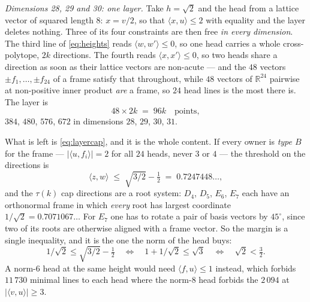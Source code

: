 \documentclass[11pt]{amsart}
\theoremstyle{remark}
\newcommand{\ip}[2]{\langle #1,#2\rangle}
\newcommand{\R}{\mathbb{R}}
\begin{document}
\emph{Dimensions 28, 29 and 30: one layer.} Take $h=\sqrt2$ and the head from
a lattice vector of squared length $8$: $x=v/2$, so that $\ip{x}{u}\le2$ with
equality and the layer deletes nothing. Three of its four constraints are then
free \emph{in every dimension}. The third line of \eqref{eq:heights} reads
$\ip{w}{w'}\le0$, so one head carries a whole cross-polytope, $2k$ directions.
The fourth reads $\ip{x}{x'}\le0$, so two heads share a direction as soon as
their lattice vectors are non-acute --- and the $48$ vectors
$\pm f_{1},\dots,\pm f_{24}$ of a frame satisfy that throughout, while $48$
vectors of $\R^{24}$ pairwise at non-positive inner product \emph{are} a frame,
so $24$ head lines is the most there is. The layer is
\begin{equation}\label{eq:framelayer}
  48\times2k \;=\; 96k \quad\text{points},
\end{equation}
$384$, $480$, $576$, $672$ in dimensions $28$, $29$, $30$, $31$.

What is left is \eqref{eq:layercap}, and it is the whole content. If
every owner is \emph{type $B$} for the frame --- $|\ip{u}{f_{i}}|=2$ for all
$24$ heads, never $3$ or $4$ --- the threshold on the directions is
\begin{equation}\label{eq:framethr}
  \ip{z}{w}\;\le\;\sqrt{3/2}-\tfrac12\;=\;0.7247448\ldots,
\end{equation}
and the $\tau(k)$ cap directions are a root system: $D_{4}$, $D_{5}$, $E_{6}$,
$E_{7}$ each have an orthonormal frame in which \emph{every} root has largest
coordinate $1/\sqrt2=0.7071067\ldots$ For $E_{7}$ one has to rotate a pair of
basis vectors by $45^{\circ}$, since two of its roots are otherwise aligned with
a frame vector. So the margin is a single inequality, and it is the one the
norm of the head buys:
\begin{equation}\label{eq:sqrt2}
  1/\sqrt2\le\sqrt{3/2}-\tfrac12
  \quad\Longleftrightarrow\quad 1+1/\sqrt2\le\sqrt3
  \quad\Longleftrightarrow\quad \sqrt2<\tfrac32 .
\end{equation}
A norm-$6$ head at the same height would need $\ip{f}{u}\le1$ instead, which
forbids $11\,730$ minimal lines to each head where the norm-$8$ head forbids the
$2\,094$ at $|\ip{v}{u}|\ge3$.
\end{document}
